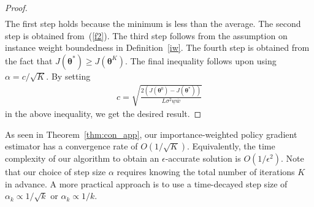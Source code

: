 \begin{proof}
\begin{eqnarray}
\end{eqnarray}
The first step holds because the minimum is less than the average. 
The second step is obtained from~(\ref{f2}). 
The third step follows from the assumption on instance weight boundedness in Definition~\ref{iw}.
The fourth step is obtained from the fact that $J(\bm{\theta}^*)\ge J(\bm{\theta}^K)$.
The final inequality follows upon using $\alpha=c/\sqrt{K}$.
By setting
\begin{eqnarray}
c = \sqrt{\frac{2(J(\bm{\theta}^0)-J(\bm{\theta}^*))}{L\sigma^2\underline{w}\overline{w}}}
\end{eqnarray}
in the above inequality, we get the desired result. 
\end{proof}

As seen in Theorem~\ref{thm:con_app}, our importance-weighted policy gradient estimator has a convergence rate of $O(1/\sqrt{K})$. 
Equivalently, the time complexity of our algorithm to obtain an $\epsilon$-accurate solution is $O(1/\epsilon^2)$.
Note that our choice of step size $\alpha$ requires knowing the total number of iterations $K$ in advance.
A more practical approach is to use a time-decayed step size of $\alpha_k\propto 1/\sqrt{k}$ or $\alpha_k\propto 1/k$.






